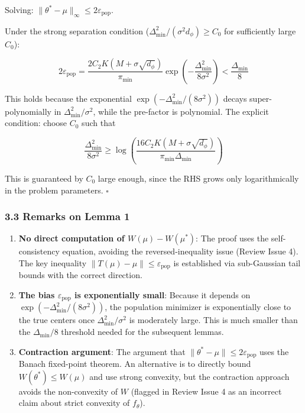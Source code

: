 \documentclass[
  12pt,
]{article}
\begin{document}
Solving: \(\|\theta^* - \mu\|_\infty \leq 2\varepsilon_{\text{pop}}\).

Under the strong separation condition
(\(\Delta_{\min}^2 / (\sigma^2 d_\phi) \geq C_0\) for sufficiently large
\(C_0\)):

\[2\varepsilon_{\text{pop}} = \frac{2C_2 K(M + \sigma\sqrt{d_\phi})}{\pi_{\min}} \exp\left(-\frac{\Delta_{\min}^2}{8\sigma^2}\right) < \frac{\Delta_{\min}}{8}\]

This holds because the exponential
\(\exp(-\Delta_{\min}^2/(8\sigma^2))\) decays super-polynomially in
\(\Delta_{\min}^2/\sigma^2\), while the pre-factor is polynomial. The
explicit condition: choose \(C_0\) such that

\[\frac{\Delta_{\min}^2}{8\sigma^2} \geq \log\left( \frac{16C_2 K(M + \sigma\sqrt{d_\phi})}{\pi_{\min} \Delta_{\min}} \right)\]

This is guaranteed by \(C_0\) large enough, since the RHS grows only
logarithmically in the problem parameters. \(\square\)

\subsubsection{3.3 Remarks on Lemma 1}\label{remarks-on-lemma-1}

\begin{enumerate}
\def\labelenumi{\arabic{enumi}.}
\item
  \textbf{No direct computation of \(W(\mu) - W(\mu^*)\)}: The proof
  uses the self-consistency equation, avoiding the reversed-inequality
  issue (Review Issue 4). The key inequality
  \(\|T(\mu) - \mu\| \leq \varepsilon_{\text{pop}}\) is established via
  sub-Gaussian tail bounds with the correct direction.
\item
  \textbf{The bias \(\varepsilon_{\text{pop}}\) is exponentially small}:
  Because it depends on \(\exp(-\Delta_{\min}^2/(8\sigma^2))\), the
  population minimizer is exponentially close to the true centers once
  \(\Delta_{\min}^2/\sigma^2\) is moderately large. This is much smaller
  than the \(\Delta_{\min}/8\) threshold needed for the subsequent
  lemmas.
\item
  \textbf{Contraction argument}: The argument that
  \(\|\theta^* - \mu\| \leq 2\varepsilon_{\text{pop}}\) uses the Banach
  fixed-point theorem. An alternative is to directly bound
  \(W(\theta^*) \leq W(\mu)\) and use strong convexity, but the
  contraction approach avoids the non-convexity of \(W\) (flagged in
  Review Issue 4 as an incorrect claim about strict convexity of
  \(f_\theta\)).
\end{enumerate}
\end{document}
